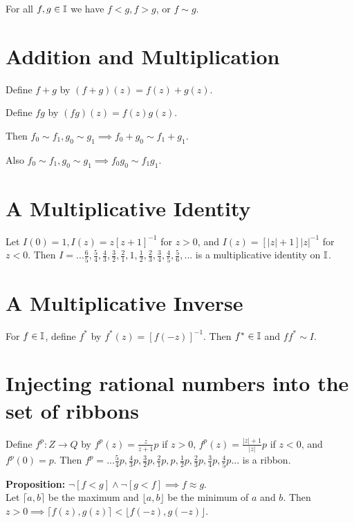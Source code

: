 \documentclass{article}
\newcommand{\ribbons}{\Bbb I}
\newcommand{\ident}{I}
\begin{document}
\begin{huge}
{{For all $f,g \in \ribbons$ we have $f < g, f>g$, or $f \sim g$.\\

\section{Addition and Multiplication}

Define $f + g$ by $(f + g)(z) = f(z) + g(z)$.

Define $fg$ by $(fg)(z) = f(z)g(z)$. 

Then $f_0 \sim f_1, g_0 \sim g_1 \implies f_0 + g_0 \sim f_1 + g_1$.

Also $f_0 \sim f_1, g_0 \sim g_1 \implies f_0g_0 \sim f_1g_1$.\\

\section{A Multiplicative Identity}

Let $\ident(0) = 1, \ident(z) = z[z+1]^{-1}$ for $z > 0$, and $\ident(z) = [|z|+1]|z|^{-1}$ for $z < 0$. Then  $\ident = ...\frac{6}{5},\frac{5}{4},\frac{4}{3},\frac{3}{2},\frac{2}{1},1,\frac{1}{2},\frac{2}{3},\frac{3}{4},\frac{4}{5},\frac{5}{6},... $ is a multiplicative identity on $\ribbons$. 

\section{A Multiplicative Inverse}

For $f \in \ribbons$, define $f^*$ by $f^*(z) =  [ f(-z) ]^{-1} $. Then $f^* \in \ribbons$ and $ff^* \sim \ident$.

\section{Injecting rational numbers into the set of ribbons}

Define $f^p : Z \to Q$ by $f^p(z) = \frac{z}{z+1}p$ if $z > 0$, $f^p(z) = \frac{|z|+1}{|z|}p$ if $z < 0$, and $f^p(0) = p$. Then $f^p = ... \frac{5}{4}p,\frac{4}{3}p,\frac{3}{2}p,\frac{2}{1}p,p,\frac{1}{2}p,\frac{2}{3}p,\frac{3}{4}p,\frac{4}{5}p ...$ is a ribbon.

\textbf{Proposition:} $\neg [ f < g ] \wedge \neg [ g < f ]  \implies f \approx g$.\\ 


Let $\lceil{a,b}\rceil$ be the maximum and $\lfloor{a,b}\rfloor$ be the minimum of $a$ and $b$.  Then  $z > 0  \implies \lceil f(z),g(z) \rceil < \lfloor f(-z),g(-z) \rfloor$. 

}}
\end{huge}
\end{document}
